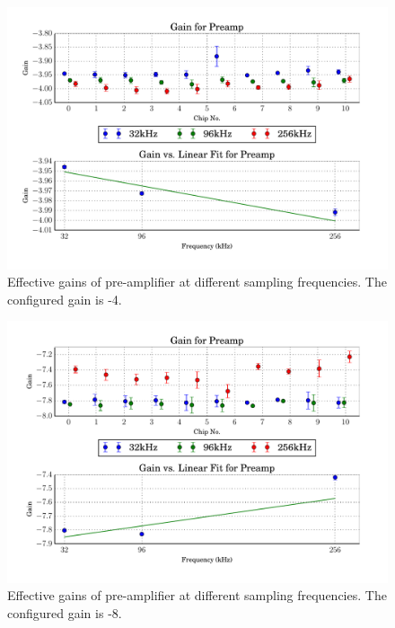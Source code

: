 \begin{figure}
    \centering
    \includegraphics[width=\linewidth]{images/plots/dc_slope_preamp_gain-4.pdf}
    \caption{Effective gains of pre-amplifier at different sampling frequencies. The configured gain is -4.}
    \label{fig:preamp_slope-4}
\end{figure}
\begin{figure}
    \centering
    \includegraphics[width=\linewidth]{images/plots/dc_slope_preamp_gain-8.pdf}
    \caption{Effective gains of pre-amplifier at different sampling frequencies. The configured gain is -8.}
    \label{fig:preamp_slope-8}
\end{figure}
